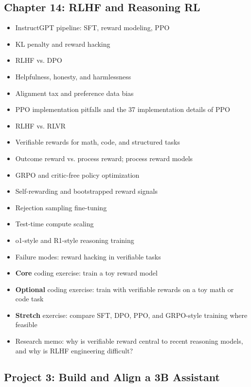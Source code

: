 \documentclass[11pt]{article}
\begin{document}
\subsection{Chapter 14: RLHF and Reasoning RL}

\begin{itemize}
    \item InstructGPT pipeline: SFT, reward modeling, PPO
    \item KL penalty and reward hacking
    \item RLHF vs. DPO
    \item Helpfulness, honesty, and harmlessness
    \item Alignment tax and preference data bias
    \item PPO implementation pitfalls and the 37 implementation details of PPO
    \item RLHF vs. RLVR
    \item Verifiable rewards for math, code, and structured tasks
    \item Outcome reward vs. process reward; process reward models
    \item GRPO and critic-free policy optimization
    \item Self-rewarding and bootstrapped reward signals
    \item Rejection sampling fine-tuning
    \item Test-time compute scaling
    \item o1-style and R1-style reasoning training
    \item Failure modes: reward hacking in verifiable tasks
    \item \textbf{Core} coding exercise: train a toy reward model
    \item \textbf{Optional} coding exercise: train with verifiable rewards on a toy math or code task
    \item \textbf{Stretch} exercise: compare SFT, DPO, PPO, and GRPO-style training where feasible
    \item Research memo: why is verifiable reward central to recent reasoning models, and why is RLHF engineering difficult?
\end{itemize}

\subsection{Project 3: Build and Align a 3B Assistant}
\end{document}
